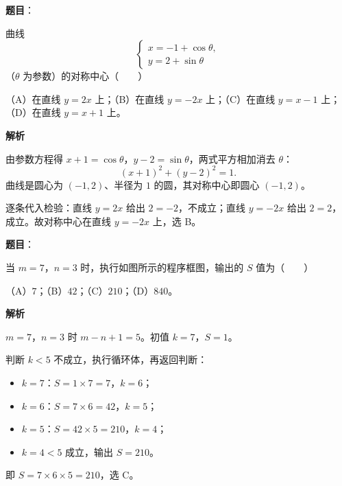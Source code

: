 \begin{answer}

\textbf{题目}：

曲线
\nopagebreak[4]
\[\begin{cases}
x=-1+\cos\theta,\\
y=2+\sin\theta
\end{cases}\]
（$\theta$ 为参数）的对称中心\mbox{（　　）}

（A）在直线 $y=2x$ 上；（B）在直线 $y=-2x$ 上；（C）在直线 $y=x-1$ 上；（D）在直线 $y=x+1$ 上。

\textbf{解析}

由参数方程得 $x+1=\cos\theta$，$y-2=\sin\theta$，两式平方相加消去 $\theta$：
\nopagebreak[4]
\[(x+1)^2+(y-2)^2=1 .\]
曲线是圆心为 $(-1,2)$、半径为 $1$ 的圆，其对称中心即圆心 $(-1,2)$。

逐条代入检验：直线 $y=2x$ 给出 $2=-2$，不成立；直线 $y=-2x$ 给出 $2=2$，成立。故对称中心在直线 $y=-2x$ 上，选 B。


\end{answer}
\begin{answer}

\textbf{题目}：

当 $m=7$，$n=3$ 时，执行如图所示的程序框图，输出的 $S$ 值为\mbox{（　　）}
\nopagebreak[4]
\begin{center}\end{center}
\nopagebreak[4]
（A）$7$；（B）$42$；（C）$210$；（D）$840$。

\textbf{解析}

$m=7$，$n=3$ 时 $m-n+1=5$。初值 $k=7$，$S=1$。

判断 $k<5$ 不成立，执行循环体，再返回判断：

\begin{itemize}
\item $k=7$：$S=1\times7=7$，$k=6$；
\item $k=6$：$S=7\times6=42$，$k=5$；
\item $k=5$：$S=42\times5=210$，$k=4$；
\item $k=4<5$ 成立，输出 $S=210$。
\end{itemize}

即 $S=7\times6\times5=210$，选 C。


\end{answer}
